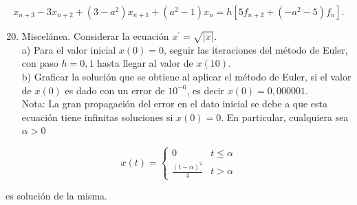 \documentclass[10pt]{book}
\begin{document}
$$
x_{n+3}-3 x_{n+2}+\left(3-a^{2}\right) x_{n+1}+\left(a^{2}-1\right) x_{n}=h\left[5 f_{n+2}+\left(-a^{2}-5\right) f_{n}\right] .
$$

\begin{enumerate}
  \setcounter{enumi}{19}
  \item Miscelánea. Considerar la ecuación $x^{\prime}=\sqrt{|x|}$.\\
a) Para el valor inicial $x(0)=0$, seguir las iteraciones del método de Euler, con paso $h=0,1$ hasta llegar al valor de $x(10)$.\\
b) Graficar la solución que se obtiene al aplicar el método de Euler, si el valor de $x(0)$ es dado con un error de $10^{-6}$, es decir $x(0)=0,000001$.\\
Nota: La gran propagación del error en el dato inicial se debe a que esta ecuación tiene infinitas soluciones si $x(0)=0$. En particular, cualquiera sea $\alpha>0$
\end{enumerate}

$$
x(t)= \begin{cases}0 & t \leq \alpha \\ \frac{(t-\alpha)^{2}}{4} & t>\alpha\end{cases}
$$

es solución de la misma.
\end{document}
